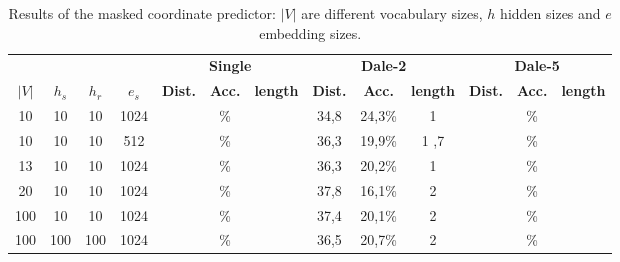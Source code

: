\begin{table}[h]
    \centering
    \begin{tabular}{cccc|ccc|ccc|ccc}
        \toprule
              &         &         &         & \multicolumn{3}{c}{\textbf{Single}} & \multicolumn{3}{c}{\textbf{Dale-2}} & \multicolumn{3}{c}{\textbf{Dale-5}}                                                                                                       \\\cmidrule(lr){5-7}\cmidrule(lr){8-10}\cmidrule(lr){11-13}
        $|V|$ & $h_{s}$ & $h_{r}$ & $e_{s}$ & \textbf{Dist.}                      & \textbf{Acc.}                       & \textbf{length}                     & \textbf{Dist.} & \textbf{Acc.} & \textbf{length} & \textbf{Dist.} & \textbf{Acc.} & \textbf{length} \\\midrule
        {10}  & {10}    & {10}    & {1024}  & {}                                  & {\%}                                & {}                                  & {34,8}         & {24,3\%}      & {1}             & {}             & {\%}          & {}              \\
        {10}  & {10}    & {10}    & {512}   & {}                                  & {\%}                                & {}                                  & {36,3}         & {19,9\%}      & {1
        ,7}   & {}      & {\%}    & {}                                                                                                                                                                                                                              \\
        {13}  & {10}    & {10}    & {1024}  & {}                                  & {\%}                                & {}                                  & {36,3}         & {20,2\%}      & {1}             & {}             & {\%}          & {}              \\
        {20}  & {10}    & {10}    & {1024}  & {}                                  & {\%}                                & {}                                  & {37,8}         & {16,1\%}      & {2}             & {}             & {\%}          & {}              \\
        {100} & {10}    & {10}    & {1024}  & {}                                  & {\%}                                & {}                                  & {37,4}         & {20,1\%}      & {2}             & {}             & {\%}          & {}              \\
        {100} & {100}   & {100}   & {1024}  & {}                                  & {\%}                                & {}                                  & {36,5}         & {20,7\%}      & {2}             & {}             & {\%}          & {}              \\
        \bottomrule
    \end{tabular}
    \caption{Results of the masked coordinate predictor: $|V|$ are different vocabulary sizes, $h$ hidden sizes and $e$ embedding sizes.}
    \label{tab:results_masked_predictor_game}
\end{table}